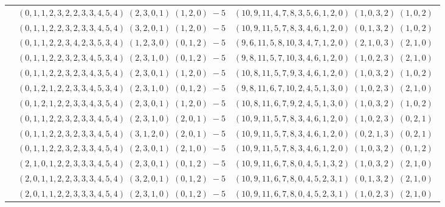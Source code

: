 \documentclass[11pt]{article}
\begin{document}
\begin{longtable}[l]{|c|c|c|}
 \cline{2-3} 
 & $(0 ,1 ,1 ,2 ,3 ,2 ,2 ,3 ,3 ,4 ,5 ,4) \;(2 ,3 ,0 ,1) \;(1 ,2 ,0) \;-5$ & $(10 ,9 ,11 ,4 ,7 ,8 ,3 ,5 ,6 ,1 ,2 ,0) \;(1 ,0 ,3 ,2) \;(1 ,0 ,2) \;$\\ 
 \cline{2-3} 
 & $(0 ,1 ,1 ,2 ,2 ,3 ,2 ,3 ,3 ,4 ,5 ,4) \;(3 ,2 ,0 ,1) \;(1 ,2 ,0) \;-5$ & $(10 ,9 ,11 ,5 ,7 ,8 ,3 ,4 ,6 ,1 ,2 ,0) \;(0 ,1 ,3 ,2) \;(1 ,0 ,2) \;$\\ 
 \cline{2-3} 
 & $(0 ,1 ,1 ,2 ,2 ,3 ,4 ,2 ,3 ,5 ,3 ,4) \;(1 ,2 ,3 ,0) \;(0 ,1 ,2) \;-5$ & $(9 ,6 ,11 ,5 ,8 ,10 ,3 ,4 ,7 ,1 ,2 ,0) \;(2 ,1 ,0 ,3) \;(2 ,1 ,0) \;$\\ 
 \cline{2-3} 
 & $(0 ,1 ,1 ,2 ,2 ,3 ,2 ,3 ,4 ,5 ,3 ,4) \;(2 ,3 ,1 ,0) \;(0 ,1 ,2) \;-5$ & $(9 ,8 ,11 ,5 ,7 ,10 ,3 ,4 ,6 ,1 ,2 ,0) \;(1 ,0 ,2 ,3) \;(2 ,1 ,0) \;$\\ 
 \cline{2-3} 
 & $(0 ,1 ,1 ,2 ,2 ,3 ,2 ,3 ,4 ,3 ,5 ,4) \;(2 ,3 ,0 ,1) \;(1 ,2 ,0) \;-5$ & $(10 ,8 ,11 ,5 ,7 ,9 ,3 ,4 ,6 ,1 ,2 ,0) \;(1 ,0 ,3 ,2) \;(1 ,0 ,2) \;$\\ 
 \cline{2-3} 
 & $(0 ,1 ,2 ,1 ,2 ,2 ,3 ,3 ,4 ,5 ,3 ,4) \;(2 ,3 ,1 ,0) \;(0 ,1 ,2) \;-5$ & $(9 ,8 ,11 ,6 ,7 ,10 ,2 ,4 ,5 ,1 ,3 ,0) \;(1 ,0 ,2 ,3) \;(2 ,1 ,0) \;$\\ 
 \cline{2-3} 
 & $(0 ,1 ,2 ,1 ,2 ,2 ,3 ,3 ,4 ,3 ,5 ,4) \;(2 ,3 ,0 ,1) \;(1 ,2 ,0) \;-5$ & $(10 ,8 ,11 ,6 ,7 ,9 ,2 ,4 ,5 ,1 ,3 ,0) \;(1 ,0 ,3 ,2) \;(1 ,0 ,2) \;$\\ 
 \cline{2-3} 
 & $(0 ,1 ,1 ,2 ,2 ,3 ,2 ,3 ,3 ,4 ,5 ,4) \;(2 ,3 ,1 ,0) \;(2 ,0 ,1) \;-5$ & $(10 ,9 ,11 ,5 ,7 ,8 ,3 ,4 ,6 ,1 ,2 ,0) \;(1 ,0 ,2 ,3) \;(0 ,2 ,1) \;$\\ 
 \cline{2-3} 
 & $(0 ,1 ,1 ,2 ,2 ,3 ,2 ,3 ,3 ,4 ,5 ,4) \;(3 ,1 ,2 ,0) \;(2 ,0 ,1) \;-5$ & $(10 ,9 ,11 ,5 ,7 ,8 ,3 ,4 ,6 ,1 ,2 ,0) \;(0 ,2 ,1 ,3) \;(0 ,2 ,1) \;$\\ 
 \cline{2-3} 
 & $(0 ,1 ,1 ,2 ,2 ,3 ,2 ,3 ,3 ,4 ,5 ,4) \;(2 ,3 ,0 ,1) \;(2 ,1 ,0) \;-5$ & $(10 ,9 ,11 ,5 ,7 ,8 ,3 ,4 ,6 ,1 ,2 ,0) \;(1 ,0 ,3 ,2) \;(0 ,1 ,2) \;$\\ 
 \cline{2-3} 
 & $(2 ,1 ,0 ,1 ,2 ,2 ,3 ,3 ,3 ,4 ,5 ,4) \;(2 ,3 ,0 ,1) \;(0 ,1 ,2) \;-5$ & $(10 ,9 ,11 ,6 ,7 ,8 ,0 ,4 ,5 ,1 ,3 ,2) \;(1 ,0 ,3 ,2) \;(2 ,1 ,0) \;$\\ 
 \cline{2-3} 
 & $(2 ,0 ,1 ,1 ,2 ,2 ,3 ,3 ,3 ,4 ,5 ,4) \;(3 ,2 ,0 ,1) \;(0 ,1 ,2) \;-5$ & $(10 ,9 ,11 ,6 ,7 ,8 ,0 ,4 ,5 ,2 ,3 ,1) \;(0 ,1 ,3 ,2) \;(2 ,1 ,0) \;$\\ 
 \cline{2-3} 
 & $(2 ,0 ,1 ,1 ,2 ,2 ,3 ,3 ,3 ,4 ,5 ,4) \;(2 ,3 ,1 ,0) \;(0 ,1 ,2) \;-5$ & $(10 ,9 ,11 ,6 ,7 ,8 ,0 ,4 ,5 ,2 ,3 ,1) \;(1 ,0 ,2 ,3) \;(2 ,1 ,0) \;$\\ 

\end{longtable}
\end{document}
